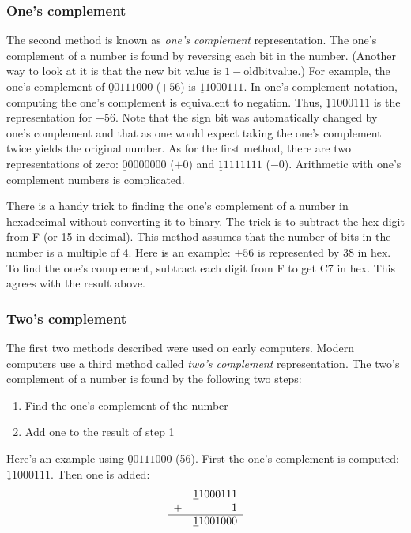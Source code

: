 \subsubsection{One's complement }
The second method is known as \emph{one's complement} representation. The
one's complement of a number is found by reversing each bit in the number.
(Another way to look at it is that the new bit value is $1 - \mathrm{old bit value}$.) 
For example, the one's complement of 
$\underline{0}0111000$ ($+56$) is $\underline{1}1000111$. In one's complement
notation, computing the one's complement is equivalent to negation. Thus,
$\underline{1}1000111$ is the representation for $-56$. Note that the sign
bit was automatically changed by one's complement and that as one would
expect taking the one's complement twice yields the original number. As for
the first method, there are two representations of zero: 
$\underline{0}0000000$ ($+0$) and $\underline{1}1111111$ ($-0$). Arithmetic
with one's complement numbers is complicated.

There is a handy trick to finding the one's complement of a number in
hexadecimal without converting it to binary. The trick is to subtract the
hex digit from F (or 15 in decimal). This method assumes that the number of
bits in the number is a multiple of 4. Here is an example: $+56$ is
represented by 38 in hex. To find the one's complement, subtract each
digit from F to get C7 in hex. This agrees with the result above.

\subsubsection{Two's complement 
               }

The first two methods described were used on early computers. Modern computers
use a third method called \emph{two's complement} representation. The two's
complement of a number is found by the following two steps:
\begin{enumerate}
\item Find the one's complement of the number
\item Add one to the result of step 1
\end{enumerate}
Here's an example using $\underline{0}0111000$ (56). First the one's complement
is computed: $\underline{1}1000111$. Then one is added:
\[
\begin{array}{rr}
 & \underline{1}1000111 \\
+&                    1 \\ \hline
 & \underline{1}1001000
\end{array}
\]

